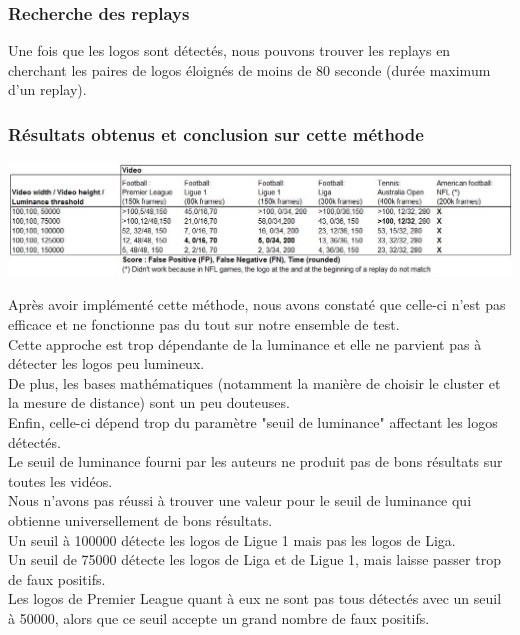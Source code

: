 \documentclass[11pt]{article}
\begin{document}
\subsubsection{Recherche des replays}
\label{sec:orga239b19}
Une fois que les logos sont détectés, nous pouvons trouver les replays en cherchant les paires de logos éloignés de moins de 80 seconde (durée maximum d'un replay).\\

\subsubsection{Résultats obtenus et conclusion sur cette méthode}
\label{sec:org98ca862}
\begin{center}
\includegraphics[width=15cm]{robust_res.JPG}
\end{center}
Après avoir implémenté cette méthode, nous avons constaté que celle-ci n'est pas efficace et ne fonctionne pas du tout sur notre ensemble de test.\\
Cette approche est trop dépendante de la luminance et elle ne parvient pas à détecter les logos peu lumineux.\\
De plus, les bases mathématiques (notamment la manière de choisir le cluster et la mesure de distance) sont un peu douteuses.\\
Enfin, celle-ci dépend trop du paramètre "seuil de luminance" affectant les logos détectés.\\
Le seuil de luminance fourni par les auteurs ne produit pas de bons résultats sur toutes les vidéos.\\
Nous n'avons pas réussi à trouver une valeur pour le seuil de luminance qui obtienne universellement de bons résultats.\\
Un seuil à 100000 détecte les logos de Ligue 1 mais pas les logos de Liga.\\
Un seuil de 75000 détecte les logos de Liga et de Ligue 1, mais laisse passer trop de faux positifs.\\
Les logos de Premier League quant à eux ne sont pas tous détectés avec un seuil à 50000, alors que ce seuil accepte un grand nombre de faux positifs.\\
\end{document}

